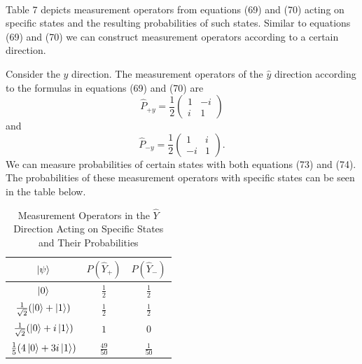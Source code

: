 \documentclass[twocolumn]{article}
\begin{document}
\\
Table 7 depicts measurement operators from equations (69) and (70) acting on specific states and the resulting probabilities of such states. Similar to equations (69) and (70) we can construct measurement operators according to a certain direction.

Consider the $\hat{y}$ direction. The measurement operators of the $\hat{y}$ direction according to the formulas in equations (69) and (70) are
\begin{equation}
\hat{P}_{+y}=\frac{1}{2}
\begin{pmatrix}
1 & -i \\
i & 1
\end{pmatrix}
\end{equation}
and
\begin{equation}
\hat{P}_{-y}=\frac{1}{2}
\begin{pmatrix}
1 & i \\
-i & 1
\end{pmatrix}.
\end{equation}
We can measure probabilities of certain states with both equations (73) and (74). The probabilities of these measurement operators with specific states can be seen in the table below.
\begin{table}[h!]
\begin{center}
\begin{tabular}{ |c|c|c| }
\hline $\ket{\psi}$& $P(\hat{Y}_+)$& $P(\hat{Y}_-)$ \\
\hline $\ket{0}$& $\frac{1}{2}$& $\frac{1}{2}$ \\
\hline $\frac{1}{\sqrt{2}}(\ket{0}+\ket{1})$& $\frac{1}{2}$& $\frac{1}{2}$ \\
\hline $\frac{1}{\sqrt{2}}(\ket{0}+i\ket{1})$& $1$& $0$ \\
\hline $\frac{1}{5}(4\ket{0}+3i\ket{1})$& $\frac{49}{50}$& $\frac{1}{50}$ \\
\hline
\end{tabular}
\caption{Measurement Operators in the $\hat{Y}$ Direction Acting on Specific States and Their Probabilities}
\end{center}
\end{table} \\
\end{document}
